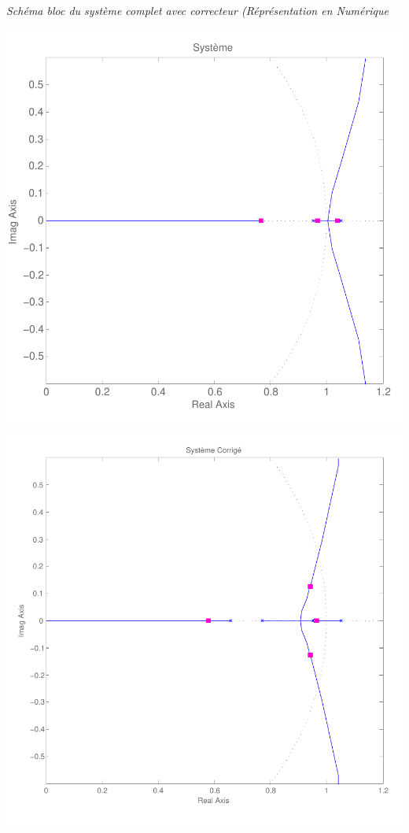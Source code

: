 \documentclass[11pt, french]{article} %
\begin{document}
\begin{center}

\emph{Schéma bloc du système complet avec correcteur (Réprésentation en Numérique}
\end{center}

\includegraphics[scale=0.50]{RLN_Sys_Seul.pdf}
\includegraphics[scale=0.50]{RLN_Sys_AvPh_K5.pdf}
\end{document}

